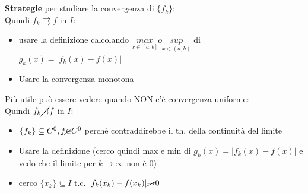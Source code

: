 \documentclass[a4paper, oneside]{article}
\begin{document}
\hfill\\\hfill\\
\textbf{Strategie} per studiare la convergenza di $\{f_k\}$:\\
Quindi $f_k \rightrightarrows f$ in $I$:
\begin{itemize}
  \item usare la definizione calcolando $\underset{x \in [a,b]}{max} o \underset{x \in (a,b)}{sup}$ di $g_k(x) = |f_k(x) - f(x)|$
  \item Usare la convergenza monotona
\end{itemize}
Più utile può essere vedere quando NON c'è convergenza uniforme:\\
Quindi $f_k \cancel{\rightrightarrows} f$ in $I$:
\begin{itemize}
  \item $\{f_k\} \subseteq C^0, f \cancel{\in} C^0$ perchè contraddirebbe il th. della continuità del limite
  \item Usare la definizione (cerco quindi max e min di $g_k(x) = |f_k(x) - f(x)|$ e vedo che il limite per $k \to \infty$ non è 0)
  \item cerco  $\{x_k\} \subseteq I$ t.c. $|f_k(x_k) - f(x_k)| \cancel{\to } 0$
\end{itemize}
\end{document}
